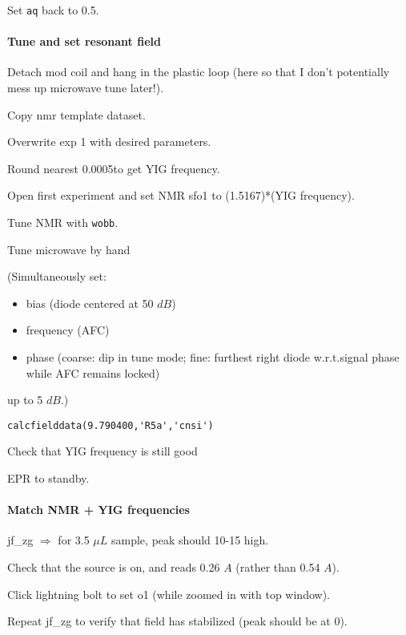 Set \texttt{aq} back to 0.5.

\paragraph{Tune and set resonant field}
Detach mod coil and hang in the plastic loop (here so that I don't potentially mess up microwave tune later!).

Copy nmr template dataset.

Overwrite exp 1 with desired parameters.

Round nearest 0.0005\GHz to get YIG frequency.

Open first experiment and set NMR sfo1 to (1.5167)*(YIG frequency).

Tune NMR with {\tt wobb}.


Tune microwave by hand
{\small (Simultaneously set:
\begin{itemize}
    \item bias (diode centered at 50 $dB$)
    \item frequency (AFC)
    \item phase (coarse: dip in tune mode; fine: furthest right diode w.r.t.signal phase while AFC remains locked)
\end{itemize}
up to 5 $dB$.)}
\begin{lstlisting}
calcfielddata(9.790400,'R5a','cnsi')
\end{lstlisting}

Check that YIG frequency is still good

EPR to standby.


\paragraph{ Match NMR + YIG frequencies}
jf\_zg $\Rightarrow$ for 3.5 $\mu L$ sample, peak should 10-15 high.

Check that the source is on, and reads 0.26 $A$ (rather than 0.54 $A$).

Click lightning bolt to set o1 (while zoomed in with top window).

Repeat jf\_zg to verify that field has stabilized (peak should be at 0).

